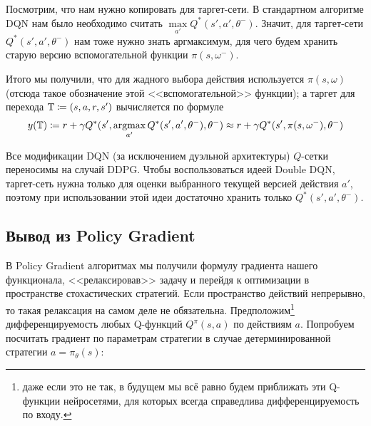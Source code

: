 Посмотрим, что нам нужно копировать для таргет-сети. В стандартном алгоритме DQN нам было необходимо считать $\max\limits_{a'} Q^*(s', a', \theta^{-})$. Значит, для таргет-сети $Q^*(s', a', \theta^{-})$ нам тоже нужно знать аргмаксимум, для чего будем хранить старую версию вспомогательной функции $\pi(s, \omega^{-})$.

Итого мы получили, что для жадного выбора действия используется $\pi(s, \omega)$ (отсюда такое обозначение этой <<вспомогательной>> функции); а таргет для перехода $\mathbb{T} \coloneqq (s, a, r, s')$ вычисляется по формуле
$$y(\mathbb{T}) \coloneqq r + \gamma Q^*(s', \mathop{\mathrm{argmax}}_{a'} Q^*(s', a', \theta^{-}), \theta^{-}) \approx r + \gamma Q^*(s', \pi(s, \omega^{-}), \theta^{-})$$

\begin{remark}
Все модификации DQN (за исключением дуэльной архитектуры) $Q$-сетки переносимы на случай DDPG. Чтобы воспользоваться идеей Double DQN, таргет-сеть нужна только для оценки выбранного текущей версией действия $a'$, поэтому при использовании этой идеи достаточно хранить только $Q^*(s', a', \theta^{-})$.
\end{remark}

\subsection{Вывод из Policy Gradient}


В Policy Gradient алгоритмах мы получили формулу градиента нашего функционала, <<релаксировав>> задачу и перейдя к оптимизации в пространстве стохастических стратегий. Если пространство действий непрерывно, то такая релаксация на самом деле не обязательна. Предположим\footnote{даже если это не так, в будущем мы всё равно будем приближать эти Q-функции нейросетями, для которых всегда справедлива дифференцируемость по входу.} дифференцируемость любых Q-функций $Q^{\pi}(s, a)$ по действиям $a$. Попробуем посчитать градиент по параметрам стратегии в случае детерминированной стратегии $a = \pi_\theta(s)$:


